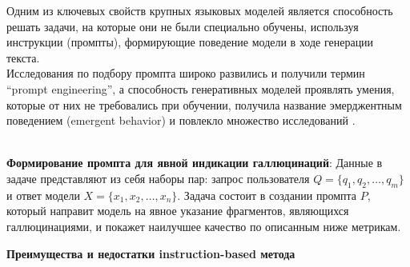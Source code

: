 \documentclass[12pt]{article}
\begin{document}
Одним из ключевых свойств крупных языковых моделей является способность решать задачи, на которые они не были специально обучены, используя инструкции (промпты), формирующие поведение модели в ходе генерации текста. \\
Исследования по подбору промпта широко развились \cite{reynolds2021promptprogramminglargelanguage, liu2021pretrainpromptpredictsystematic} и получили термин ``prompt engineering'', а способность генеративных моделей проявлять умения, которые от них не требовались при обучении, получила название эмерджентным поведением (emergent behavior) и повлекло множество исследований \cite{wei2022emergentabilitieslargelanguage, openai2024gpt4technicalreport}.

\\
\textbf{Формирование промпта для явной индикации галлюцинаций}:
   Данные в задаче представляют из себя наборы пар: запрос пользователя \( Q = \{q_1, q_2, \dots, q_m\} \) и ответ модели \( X = \{x_1, x_2, \dots, x_n\} \). Задача состоит в создании промпта \( P \), который направит модель на явное указание фрагментов, являющихся галлюцинациями, и покажет наилучшее качество по описанным ниже метрикам.
   
\textbf{Преимущества и недостатки instruction-based метода}
\end{document}
